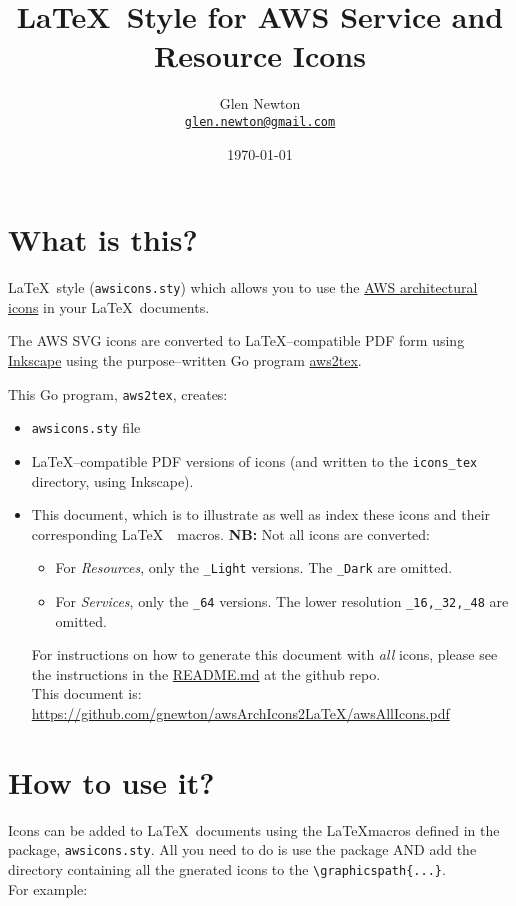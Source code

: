 \documentclass[12pt]{article}
\title{\LaTeX\ Style for AWS Service and Resource Icons}
\author{Glen Newton \\\texttt{\href{mailto:glen.newton@gmail.com}{glen.newton@gmail.com}}}
\date{\today}
\begin{document}
\maketitle
\tableofcontents\label{toc}
\noindent\makebox[\linewidth]{\rule{\paperwidth}{0.4pt}}

\section{What is this?}
\LaTeX\ style (\texttt{awsicons.sty}) which allows you to use the \href{https://aws.amazon.com/architecture/icons/}{AWS architectural icons} in your \LaTeX\  documents.

\vspace{3mm}

\noindent The AWS SVG icons are converted to {\LaTeX}--compatible PDF form using \href{https://inkscape.org/}{Inkscape} \texttt{\inkscapeVersion} using the purpose--written Go program \href{https://github.com/gnewton/awsArchIcons2LaTeX/aws2tex}{aws2tex}. 

\noindent This Go program, \texttt{aws2tex}, creates:
\begin{itemize}
\item \texttt{awsicons.sty} file
\item \LaTeX--compatible PDF versions of icons (and written to the \texttt{icons\_tex} directory, using Inkscape).
\item This document, which is to illustrate as well as index these icons and their corresponding \LaTeX\ \  macros.
  \newline
  \textbf{NB:} Not all icons are converted:
  \begin{itemize}
  \item For \textit{Resources}, only the \texttt{\_Light} versions. The \texttt{\_Dark} are omitted.
  \item For \textit{Services}, only the \texttt{\_64} versions. The lower resolution \texttt{\_16,\_32,\_48} are omitted.
  \end{itemize}
  
\noindent For instructions on how to generate this document with \textit{all} icons, please see the instructions in the \href{https://github.com/gnewton/awsArchIcons2LaTeX}{README.md} at the github repo.\\
This document is: \url{https://github.com/gnewton/awsArchIcons2LaTeX/awsAllIcons.pdf}
\end{itemize}


\section{How to use it?}
Icons can be added to \LaTeX\ documents using the \LaTeX macros defined in the package, \texttt{awsicons.sty}. All you need to do is use the package AND add the directory containing all the gnerated icons to the \texttt{{\textbackslash}graphicspath\{...\}}.\\
For example:
\end{document}

